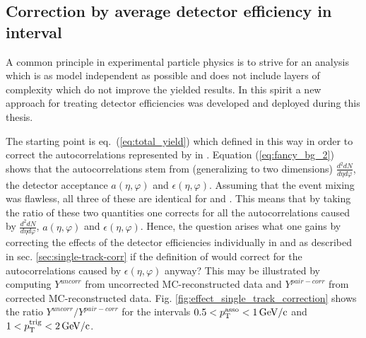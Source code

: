 \subsection{Correction by average detector efficiency in \ptassoc interval}
\label{sec:single-value-correction}

A common principle in experimental particle physics is to strive for an analysis which is as model independent as possible and does not include layers of complexity which do not improve the yielded results. In this spirit a new approach for treating detector efficiencies was developed and deployed during this thesis. 

The starting point is eq.~(\ref{eq:total_yield}) which defined in this way in order to correct the autocorrelations represented by \B in \Sig. Equation (\ref{eq:fancy_bg_2}) shows that the autocorrelations stem from (generalizing to two dimensions) $\frac{d^2dN}{d\eta d\varphi}$, the detector acceptance  $a(\eta, \varphi)$ and $\epsilon(\eta, \varphi)$. Assuming that the event mixing was flawless, all three of these are identical for \Sig and \B. This means that by taking the ratio of these two quantities one corrects for all the autocorrelations caused by $\frac{d^2dN}{d\eta d\varphi}$,  $a(\eta, \varphi)$ and $\epsilon(\eta, \varphi)$. Hence, the question arises what one gains by correcting the effects of the detector efficiencies individually in \Sig and \B as described in sec. \ref{sec:single-track-corr} if the definition of \Y would correct for the autocorrelations caused by $\epsilon(\eta, \varphi)$ anyway? This may be illustrated by computing  $Y^{uncorr}$ from uncorrected MC-reconstructed data and  $ Y^{pair-corr}$ from corrected MC-reconstructed data. Fig. \ref{fig:effect_single_track_correction} shows the ratio $Y^{uncorr}/Y^{pair-corr}$ for the intervals $0.5 < p_{\text{T}}^{\text{asso}} < \SI{1}{GeV/c}$ and $1 < p_{\text{T}}^{\text{trig}} < \SI{2}{GeV/c}$.

